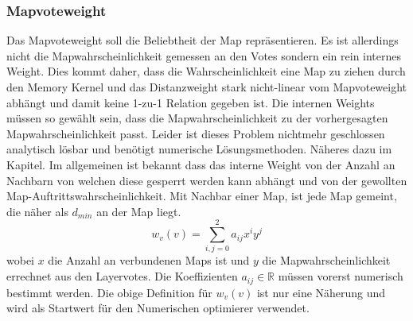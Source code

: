        \subsubsection{Mapvoteweight}
            Das Mapvoteweight soll die Beliebtheit der Map repräsentieren.
            Es ist allerdings nicht die Mapwahrscheinlichkeit gemessen an den Votes sondern ein rein internes Weight.
            Dies kommt daher, dass die Wahrscheinlichkeit eine Map zu ziehen durch den Memory Kernel und das Distanzweight stark nicht-linear vom Mapvoteweight abhängt und damit keine 1-zu-1 Relation gegeben ist.
            Die internen Weights müssen so gewählt sein, dass die Mapwahrscheinlichkeit zu der vorhergesagten Mapwahrscheinlichkeit passt.
            Leider ist dieses Problem nichtmehr geschlossen analytisch lösbar und benötigt numerische Lösungsmethoden.
            Näheres dazu im  Kapitel.
            Im allgemeinen ist bekannt dass das interne Weight von der Anzahl an \glqq Nachbarn \grqq von welchen diese gesperrt werden kann abhängt und von der gewollten Map-Auftrittswahrscheinlichkeit.
            Mit Nachbar einer Map, ist jede Map gemeint, die näher als $d_{min}$ an der Map liegt.
            \begin{equation}
                \label{eq:mapweight}
                w_v(v) = \sum_{i,j = 0}^2 a_{ij}x^i y^j
            \end{equation}
            wobei $x$ die Anzahl an verbundenen Maps ist und $y$ die Mapwahrscheinlichkeit errechnet aus den Layervotes.
            Die Koeffizienten $a_{ij}\in\mathbb{R}$ müssen vorerst numerisch bestimmt werden.
            Die obige Definition für $w_v(v)$ ist nur eine Näherung und wird als Startwert für den Numerischen optimierer verwendet. 
